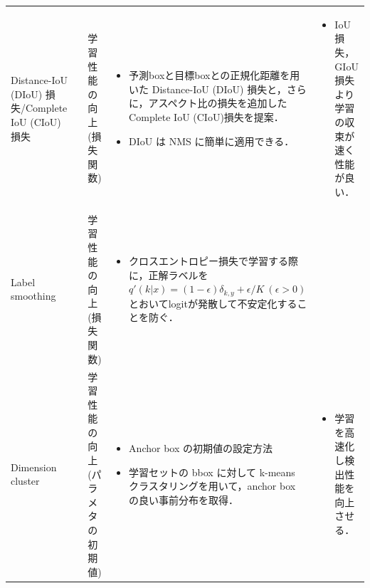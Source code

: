 \documentclass[twocolumn]{jsarticle} %
\begin{document}
\begin{table}
\begin{center}
\begin{tabularx}{\linewidth}{Xp{1.5cm}Xp{7cm}X}
            Distance-IoU (DIoU) 損失/Complete IoU (CIoU)損失
            & \cite{ZWLLYR20} & 学習性能の向上 (損失関数) & 
            \begin{itemize}
                \vspace{-0.7\baselineskip}
                \setlength{\leftskip}{-3mm}
                \item 予測boxと目標boxとの正規化距離を用いた Distance-IoU (DIoU) 損失と，さらに，アスペクト比の損失を追加したComplete IoU (CIoU)損失を提案．
                \item DIoU は NMS に簡単に適用できる．
            \end{itemize}
            &
            \begin{itemize}
                \vspace{-0.7\baselineskip}
                \setlength{\leftskip}{-3mm}
                \item IoU損失，GIoU損失より学習の収束が速く性能が良い．
            \end{itemize}
            \\

            Label smoothing
            & \cite{SVISW16} & 学習性能の向上 (損失関数) & 
            \begin{itemize}
                \vspace{-0.7\baselineskip}
                \setlength{\leftskip}{-3mm}
                \item クロスエントロピー損失で学習する際に，正解ラベルを $q'(k|x){=}(1{-}\epsilon)\delta_{k,y}{+}\epsilon/K \ (\epsilon{>}0)$とおいてlogitが発散して不安定化することを防ぐ．
            \end{itemize}
            &
            \\

            Dimension cluster
            & \cite{RedFar17} & 学習性能の向上 (パラメタの初期値) & 
            \begin{itemize}
                \vspace{-0.7\baselineskip}
                \setlength{\leftskip}{-3mm}
                \item Anchor box の初期値の設定方法
                \item 学習セットの bbox に対して k-means クラスタリングを用いて，anchor box の良い事前分布を取得．
            \end{itemize}
            &
            \begin{itemize}
                \vspace{-0.7\baselineskip}
                \setlength{\leftskip}{-3mm}
                \item 学習を高速化し検出性能を向上させる．
            \end{itemize}
            \\


\end{tabularx}
\end{center}
\end{table}
\end{document}
